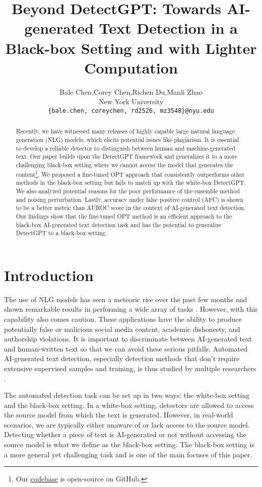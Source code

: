 \documentclass[11pt]{article}
\title{Beyond DetectGPT: Towards AI-generated Text Detection in a Black-box Setting and with Lighter Computation}
\author{Bale Chen,\quad Corey Chen,\quad Richen Du,\quad Manli Zhao \\
  New York University \\ \texttt{\{bale.chen, coreychen, rd2526, mz3548\}@nyu.edu}
  }
\begin{document}
\maketitle
\begin{abstract}
Recently, we have witnessed many releases of highly capable large natural language generation (NLG) models, which elicits potential issues like plagiarism. It is essential to develop a reliable detector to distinguish between human and machine-generated text. Our paper builds upon the DetectGPT framework \cite{detectgpt} and generalizes it to a more challenging black-box setting where we cannot access the model that generates the content\footnote{Our \href{https://github.com/BaleChen/nlu-final-project}{codebase} is open-source on GitHub.}. We proposed a fine-tuned OPT approach that consistently outperforms other methods in the black-box setting but fails to match up with the white-box DetectGPT. We also analyzed potential reasons for the poor performance of the ensemble method and noising perturbation. Lastly, accuracy under false positive control (AFC) is shown to be a better metric than AUROC score in the context of AI-generated text detection. Our findings show that the fine-tuned OPT method is an efficient approach to the black-box AI-generated text detection task and has the potential to generalize DetectGPT to a black-box setting.
\end{abstract}

\section{Introduction}
The use of NLG models has seen a meteoric rise over the past few months and shown remarkable results in performing a wide array of tasks \cite{Bhaskar2022ZeroShotOS, Hendy2023HowGA, Lamichhane2023EvaluationOC}. However, with this capability also comes caution. These applications have the ability to produce potentially false or malicious social media content, academic dishonesty, and authorship violations. It is important to discriminate between AI-generated text and human-written text so that we can avoid these serious pitfalls. Automated AI-generated text detection, especially detection methods that don't require extensive supervised samples and training, is thus studied by multiple researchers \cite{jawahar20, Kirchenbauer2023AWF, detectgpt, Gehrmann2019GLTRSD, Chakraborty2023OnTP}. 

The automated detection task can be set up in two ways: the white-box setting and the black-box setting. In a white-box setting, detectors are allowed to access the source model from which the text is generated. However, in real-world scenarios, we are typically either unaware of or lack access to the source model. Detecting whether a piece of text is AI-generated or not without accessing the source model is what we define as the black-box setting. The black-box setting is a more general yet challenging task and is one of the main focuses of this paper.
\end{document}

